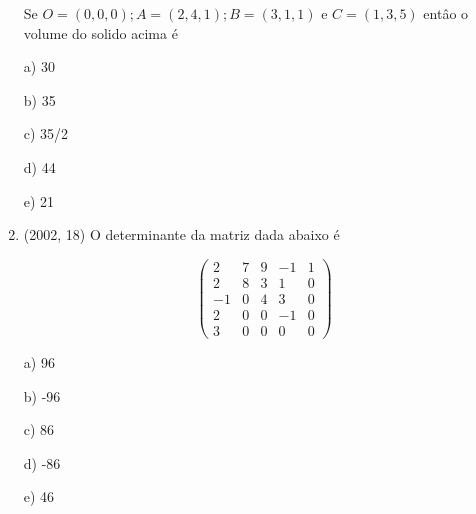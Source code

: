 \documentclass{article}
\begin{document}
\begin{enumerate}
Se $O=(0,0,0) ; A=(2,4,1) ; B=(3,1,1)$ e $C=(1,3,5)$ entâo o volume do solido
acima é

a) 30

b) 35

c) 35/2

d) 44

e) 21 \newline








\item(2002, 18) O determinante da matriz dada abaixo é 


$$\left(\begin{array}{rrrrr}{2} & {7} & {9} & {-1} & {1} \\ {2} & {8} & {3} & {1} & {0} \\ {-1} & {0} & {4} & {3} & {0} \\ {2} & {0} & {0} & {-1} & {0} \\ {3} & {0} & {0} & {0} & {0}\end{array}\right)$$

a) 96

b) -96

c) 86

d) -86

e) 46 \newline








\end{enumerate}

\newpage
\end{document}
